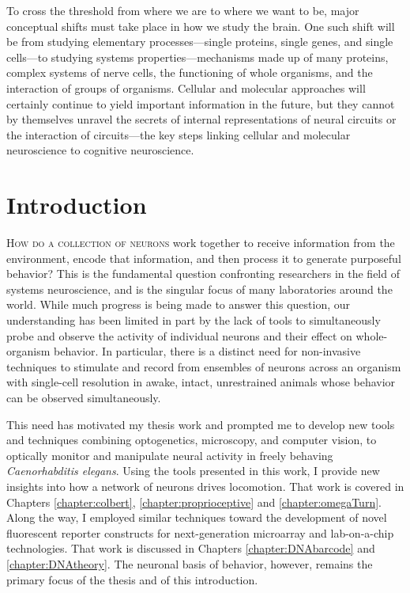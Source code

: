 \begin{savequote}[75mm] 
To cross the threshold from where we are to where we want to be, major conceptual shifts must take place in how we study the brain. One such shift will be from studying elementary processes---single proteins, single genes, and single cells---to studying systems properties---mechanisms made up of many proteins, complex systems of nerve cells, the functioning of whole organisms, and the interaction of groups of organisms. Cellular and molecular approaches will certainly continue to yield important information in the future, but they cannot by themselves unravel the secrets of internal representations of neural circuits or the interaction of circuits---the key steps linking cellular and molecular neuroscience to cognitive neuroscience. 
\end{savequote}

\chapter{Introduction}\label{chapter:intro}

\lettrine{H}{ow do a collection of neurons} work together to receive information from the environment, encode that information, and then process it to generate  purposeful behavior?  This is the fundamental question  confronting researchers in the field of systems neuroscience, and is the singular focus of many laboratories around the world. While much progress is being made to answer this question, our understanding has been limited in part by the lack of tools to simultaneously probe and observe the activity of individual neurons and their effect on whole-organism behavior. In particular, there is a distinct need for non-invasive techniques to stimulate and record from ensembles of neurons across an organism with single-cell resolution in awake, intact, unrestrained animals whose behavior can be observed simultaneously.

This need has motivated my thesis work and prompted me to develop new tools and techniques combining optogenetics, microscopy, and computer vision, to optically monitor and manipulate neural activity in freely behaving \emph{Caenorhabditis elegans}. Using the tools presented in this work, I provide new insights into how a network of neurons drives locomotion. That work is covered in Chapters \ref{chapter:colbert}, \ref{chapter:proprioceptive} and  \ref{chapter:omegaTurn}. Along the way, I employed similar techniques  toward the development of  novel fluorescent reporter constructs for next-generation microarray and lab-on-a-chip technologies. That work is discussed in Chapters \ref{chapter:DNAbarcode} and \ref{chapter:DNAtheory}. The neuronal basis of behavior, however, remains the primary focus of the thesis and of this introduction.


